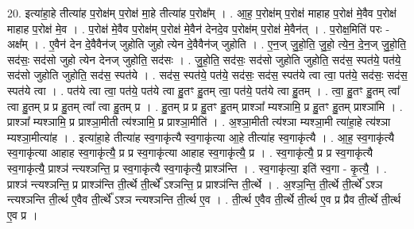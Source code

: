 \documentclass[17pt]{extarticle}
\begin{document}
20. इत्या॑हा॒हे तीत्या॑ह प॒रोक्ष॑म् प॒रोक्ष॑ मा॒हे तीत्या॑ह प॒रोक्ष᳚म् । . आ॒ह॒ प॒रोक्ष॑म् प॒रोक्ष॑ माहाह प॒रोक्ष॑ मे॒वैव प॒रोक्ष॑ माहाह प॒रोक्ष॑ मे॒व । . प॒रोक्ष॑ मे॒वैव प॒रोक्ष॑म् प॒रोक्ष॑ मे॒वैन॑ देनदे॒व प॒रोक्ष॑म् प॒रोक्ष॑ मे॒वैन॑त् । . प॒रोक्ष॒मिति॑ परः - अक्ष᳚म् । . ए॒वैन॑ देन दे॒वैवैन॑ज् जुहोति जुहो त्येन दे॒वैवैन॑ज् जुहोति । . ए॒न॒ज् जु॒हो॒ति॒ जु॒हो॒ त्ये॒न॒ दे॒न॒ज् जु॒हो॒ति॒ सद॑सः॒ सद॑सो जुहो त्येन देनज् जुहोति॒ सद॑सः । . जु॒हो॒ति॒ सद॑सः॒ सद॑सो जुहोति जुहोति॒ सद॑स॒ स्पत॑ये॒ पत॑ये॒ सद॑सो जुहोति जुहोति॒ सद॑स॒ स्पत॑ये । . सद॑स॒ स्पत॑ये॒ पत॑ये॒ सद॑सः॒ सद॑स॒ स्पत॑ये त्वा त्वा॒ पत॑ये॒ सद॑सः॒ सद॑स॒ स्पत॑ये त्वा । . पत॑ये त्वा त्वा॒ पत॑ये॒ पत॑ये त्वा हु॒तꣳ हु॒तम् त्वा॒ पत॑ये॒ पत॑ये त्वा हु॒तम् । . त्वा॒ हु॒तꣳ हु॒तम् त्वा᳚ त्वा हु॒तम् प्र प्र हु॒तम् त्वा᳚ त्वा हु॒तम् प्र । . हु॒तम् प्र प्र हु॒तꣳ हु॒तम् प्राश्ञा᳚ म्यश्ञामि॒ प्र हु॒तꣳ हु॒तम् प्राश्ञा॑मि । . प्राश्ञा᳚ म्यश्ञामि॒ प्र प्राश्ञा॒मीती त्य॑श्ञामि॒ प्र प्राश्ञा॒मीति॑ । . अ॒श्ञा॒मीती त्य॑श्ञा म्यश्ञा॒मी त्या॑हा॒हे त्य॑श्ञा म्यश्ञा॒मीत्या॑ह । . इत्या॑हा॒हे तीत्या॑ह स्व॒गाकृ॑त्यै स्व॒गाकृ॑त्या आ॒हे तीत्या॑ह स्व॒गाकृ॑त्यै । . आ॒ह॒ स्व॒गाकृ॑त्यै स्व॒गाकृ॑त्या आहाह स्व॒गाकृ॑त्यै॒ प्र प्र स्व॒गाकृ॑त्या आहाह स्व॒गाकृ॑त्यै॒ प्र । . स्व॒गाकृ॑त्यै॒ प्र प्र स्व॒गाकृ॑त्यै स्व॒गाकृ॑त्यै॒ प्राश्ञ॑ न्त्यश्ञन्ति॒ प्र स्व॒गाकृ॑त्यै स्व॒गाकृ॑त्यै॒ प्राश्ञ॑न्ति । . स्व॒गाकृ॑त्या॒ इति॑ स्व॒गा - कृ॒त्यै॒ । . प्राश्ञ॑ न्त्यश्ञन्ति॒ प्र प्राश्ञ॑न्ति ती॒र्त्थे ती॒र्त्थे᳚ ऽश्ञन्ति॒ प्र प्राश्ञ॑न्ति ती॒र्त्थे । . अ॒श्ञ॒न्ति॒ ती॒र्त्थे ती॒र्त्थे᳚ ऽश्ञ न्त्यश्ञन्ति ती॒र्त्थ ए॒वैव ती॒र्त्थे᳚ ऽश्ञ न्त्यश्ञन्ति ती॒र्त्थ ए॒व । . ती॒र्त्थ ए॒वैव ती॒र्त्थे ती॒र्त्थ ए॒व प्र प्रैव ती॒र्त्थे ती॒र्त्थ ए॒व प्र । \newline
\end{document}
